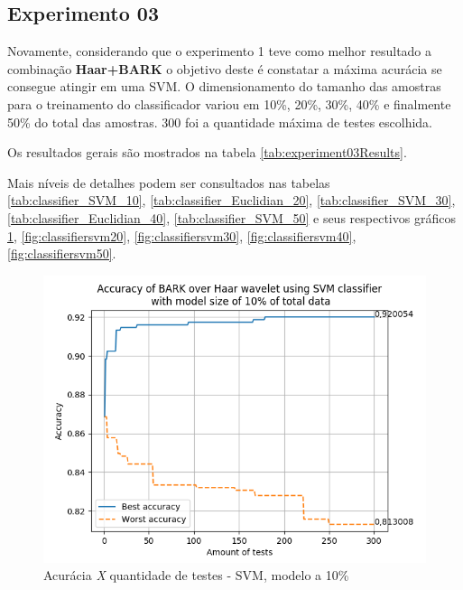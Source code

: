 \begin{myenv}{1.5}
		\newpage
		\section{Experimento 03}
			\par Novamente, considerando que o experimento 1 teve como melhor resultado a combinação \textbf{Haar+BARK} o objetivo deste é constatar a máxima acurácia se consegue atingir em uma SVM. O dimensionamento do tamanho das amostras para o treinamento do classificador variou em 10\%, 20\%, 30\%, 40\% e finalmente 50\% do total das amostras. 300 foi a quantidade máxima de testes escolhida.
			
			\par Os resultados gerais são mostrados na tabela \ref{tab:experiment03Results}. 
			
			\par Mais níveis de detalhes podem ser consultados nas tabelas \ref{tab:classifier_SVM_10}, \ref{tab:classifier_Euclidian_20}, \ref{tab:classifier_SVM_30}, \ref{tab:classifier_Euclidian_40},  \ref{tab:classifier_SVM_50} e seus respectivos gráficos \ref{fig:classifiersvm10}, \ref{fig:classifiersvm20}, \ref{fig:classifiersvm30}, \ref{fig:classifiersvm40}, \ref{fig:classifiersvm50}.

			
		
			\newpage
		\begin{figure}[h]
			\centering
			\includegraphics{images/results/confusionMatrices/classifier_SVM_10.png}
			\caption{Acurácia \textit{X} quantidade de testes - SVM, modelo a 10\%}
			\label{fig:classifiersvm10}
		\end{figure}
		


\end{myenv}
